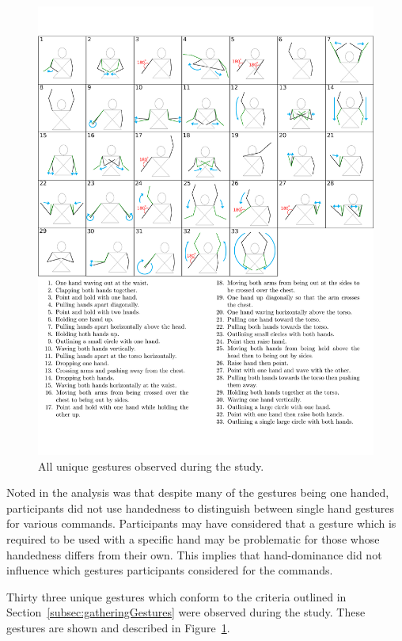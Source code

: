 \documentclass[link]{IWCOMP}
\begin{document}
\begin{figure}[p]
   \centering
   \includegraphics[width=1\textwidth]{figures/all_gestures.png}
   \caption{All unique gestures observed during the study.}
   \label{fig:allGestures}
\end{figure}

Noted in the analysis was that despite many of the gestures being one handed, participants did not use handedness to distinguish between single hand gestures for various commands.
Participants may have considered that a gesture which is required to be used with a specific hand may be problematic for those whose handedness differs from their own.
This implies that hand-dominance did not influence which gestures participants considered for the commands.

Thirty three unique gestures which conform to the criteria outlined in Section~\ref{subsec:gatheringGestures} were observed during the study.
These gestures are shown and described in Figure~\ref{fig:allGestures}.  
\end{document}

